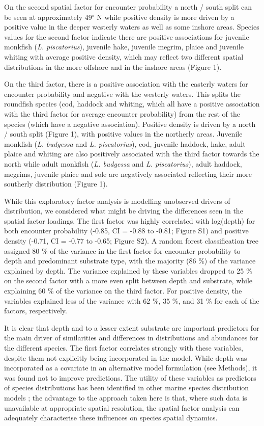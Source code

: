 \documentclass{nature}
\begin{document}
\begin{linenumbers}
On the second spatial factor for encounter probability a north / south split
can be seen at approximately 49$^{\circ}$ N while positive density is more
driven by a positive value in the deeper westerly waters as well as some
inshore areas. Species values for the second factor indicate there are
positive associations for juvenile monkfish (\emph{L. piscatorius}), juvenile
hake, juvenile megrim, plaice and juvenile whiting with average positive
density, which may reflect two different spatial distributions in the more
offshore and in the inshore areas (Figure 1).

On the third factor, there is a positive association with the easterly waters
for encounter probability and negative with the westerly waters. This splits
the roundfish species (cod, haddock and whiting, which all have a positive
association with the third factor for average encounter probability) from the
rest of the species (which have a negative association). Positive
density is driven by a north / south split (Figure 1), with positive values in
the northerly areas. Juvenile monkfish (\emph{L.  budgessa} and \emph{L.
	piscatorius}), cod, juvenile haddock, hake, adult plaice and whiting
are also positively associated with the third factor towards the north while
adult monkfish (\emph{L. budgessa} and \emph{L.  piscatorius}), adult haddock,
megrims, juvenile plaice and sole are negatively associated reflecting their
more southerly distribution (Figure 1).

While this exploratory factor analysis is modelling unobserved drivers of
distribution, we considered what might be driving the differences seen in the
spatial factor loadings. The first factor was highly correlated with log(depth)
for both encounter probability (-0.85, CI = -0.88 to -0.81; Figure S1) and
positive density (-0.71, CI = -0.77 to -0.65; Figure S2). A random forest
classification tree assigned 80 \% of the variance in the first factor for
encounter probability to depth and predominant substrate type, with the
majority (86 \%) of the variance explained by depth. The variance explained by
these variables dropped to 25 \% on the second factor with a more even split
between depth and substrate, while explaining 60 \% of the variance on the
third factor.  For positive density, the variables explained less of the
variance with 62 \%, 35 \%, and 31 \% for each of the factors, respectively.

It is clear that depth and to a lesser extent substrate are important
predictors for the main driver of similarities and differences in distributions
and abundances for the different species. The first factor correlates
strongly with these variables, despite them not explicitly being incorporated
in the model. While depth was incorporated as a covariate in an alternative
model formulation (see Methods), it was found not to improve predictions. The
utility of these variables as predictors of species distributions has been
identified in other marine species distribution models \cite{Robinson2011}; the
advantage to the approach taken here is that, where such data is unavailable at
appropriate spatial resolution, the spatial factor analysis can adequately
characterise these influences on species spatial dynamics.


\end{linenumbers}
\end{document}
